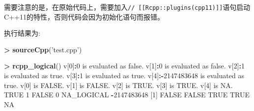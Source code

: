 \documentclass[]{ctexbook}
\newenvironment{Shaded}{\begin{snugshade}}{\end{snugshade}}
\newcommand{\KeywordTok}[1]{\textcolor[rgb]{0.13,0.29,0.53}{\textbf{#1}}}
\newcommand{\DecValTok}[1]{\textcolor[rgb]{0.00,0.00,0.81}{#1}}
\newcommand{\StringTok}[1]{\textcolor[rgb]{0.31,0.60,0.02}{#1}}
\newcommand{\OtherTok}[1]{\textcolor[rgb]{0.56,0.35,0.01}{#1}}
\newcommand{\OperatorTok}[1]{\textcolor[rgb]{0.81,0.36,0.00}{\textbf{#1}}}
\newcommand{\NormalTok}[1]{#1}
\begin{document}
需要注意的是，在原始代码上，需要加入\texttt{//\ {[}{[}Rcpp::plugins(cpp11){]}{]}}语句启动C++11的特性，否则代码会因为初始化语句而报错。

执行结果为:

\begin{Shaded}
\begin{Highlighting}[]
\OperatorTok{>}\StringTok{ }\KeywordTok{sourceCpp}\NormalTok{(}\StringTok{'test.cpp'}\NormalTok{)}

\OperatorTok{>}\StringTok{ }\KeywordTok{rcpp_logical}\NormalTok{()}
\NormalTok{v[}\DecValTok{0}\NormalTok{]}\OperatorTok{:}\DecValTok{0}\NormalTok{ is evaluated as false.}
\NormalTok{v[}\DecValTok{1}\NormalTok{]}\OperatorTok{:}\DecValTok{0}\NormalTok{ is evaluated as false.}
\NormalTok{v[}\DecValTok{2}\NormalTok{]}\OperatorTok{:}\DecValTok{1}\NormalTok{ is evaluated as true.}
\NormalTok{v[}\DecValTok{3}\NormalTok{]}\OperatorTok{:}\DecValTok{1}\NormalTok{ is evaluated as true.}
\NormalTok{v[}\DecValTok{4}\NormalTok{]}\OperatorTok{:-}\DecValTok{2147483648}\NormalTok{ is evaluated as true.}
\NormalTok{v[}\DecValTok{0}\NormalTok{] is FALSE.}
\NormalTok{v[}\DecValTok{1}\NormalTok{] is FALSE.}
\NormalTok{v[}\DecValTok{2}\NormalTok{] is TRUE.}
\NormalTok{v[}\DecValTok{3}\NormalTok{] is TRUE.}
\NormalTok{v[}\DecValTok{4}\NormalTok{] is NA.}
\OtherTok{TRUE} \DecValTok{1}
\OtherTok{FALSE} \DecValTok{0}
\NormalTok{NA_LOGICAL }\OperatorTok{-}\DecValTok{2147483648}
\NormalTok{[}\DecValTok{1}\NormalTok{] }\OtherTok{FALSE} \OtherTok{FALSE}  \OtherTok{TRUE}  \OtherTok{TRUE}    \OtherTok{NA}
\end{Highlighting}
\end{Shaded}



\backmatter
\printindex
\end{document}
